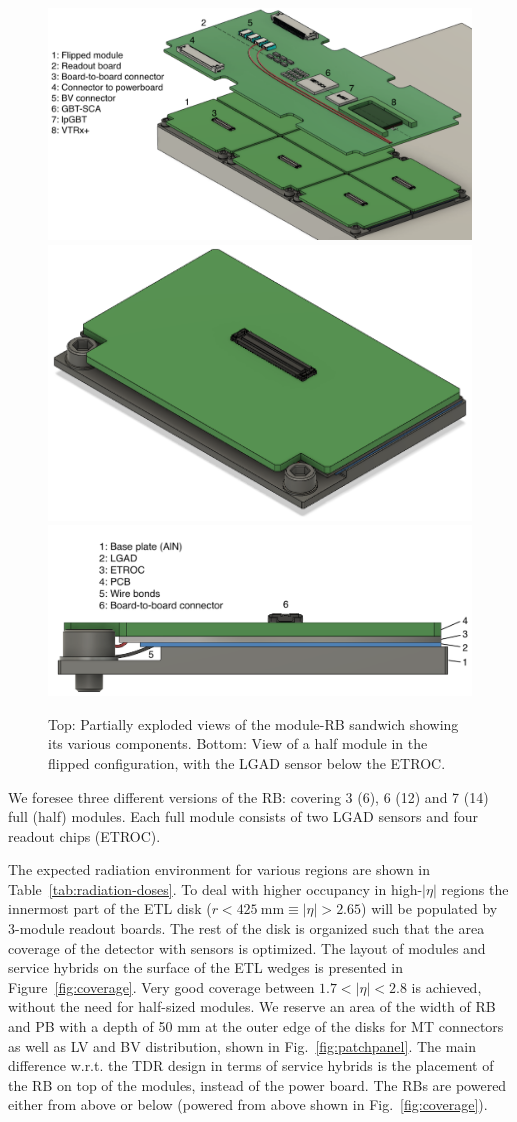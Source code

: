 \documentclass[11pt]{article}
\begin{document}
\begin{figure}[!hb]
  \centering
  \includegraphics[width=0.90 \textwidth]{figures/ETL_exploded_legend.pdf}
  \includegraphics[width=0.40 \textwidth]{figures/Flipped_module_3D_v2.png}
  \includegraphics[width=0.55 \textwidth]{figures/Flipped_module_legend_v2.png}
  \caption{
    Top: Partially exploded views of the module-RB sandwich showing its various components.
    Bottom: View of a half module in the flipped configuration, with the LGAD sensor below the ETROC.
  }
  \label{fig:flippedModule}
\end{figure}

We foresee three different versions of the RB: covering 3 (6), 6 (12) and 7 (14) full (half) modules.
Each full module consists of two LGAD sensors and four readout chips (ETROC).

The expected radiation environment for various regions are shown in Table~\ref{tab:radiation-doses}.
To deal with higher occupancy in high-$|\eta|$ regions the innermost part of the ETL disk ($r<425~\mathrm{mm} \equiv |\eta|>2.65$) will be populated by 3-module readout boards.
The rest of the disk is organized such that the area coverage of the detector with sensors is optimized.
The layout of modules and service hybrids on the surface of the ETL wedges is presented in Figure~\ref{fig:coverage}.
Very good coverage between $1.7<|\eta|<2.8$ is achieved, without the need for half-sized modules.
We reserve an area of the width of RB and PB with a depth of 50 mm at the outer edge of the disks for MT connectors as well as LV and BV distribution, shown in Fig.~\ref{fig:patchpanel}.
The main difference w.r.t. the TDR design in terms of service hybrids is the placement of the RB on top of the modules, instead of the power board.
The RBs are powered either from above or below (powered from above shown in Fig.~\ref{fig:coverage}).
\end{document}

